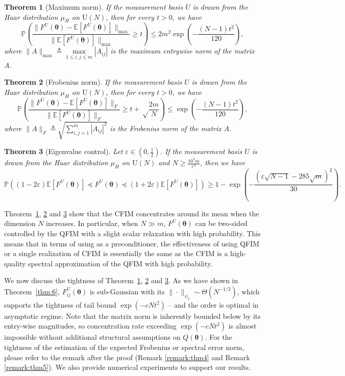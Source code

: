 \documentclass{amsart}
\theoremstyle{plain}
\newtheorem{theorem}{Theorem}
\theoremstyle{definition}
\theoremstyle{remark}
\newcommand{\thmref}[1]{Theorem~\ref{#1}}
\newcommand{\PP}{\mathbb{P}}
\newcommand{\EE}{\mathbb{E}}
\begin{document}
\begin{theorem}[Maximum norm]
\label{3}
    If the measurement basis $U$ is drawn from the Haar distribution $\mu_H$ on $\mathrm U(N)$, then for every $t>0$, we have
    \begin{equation}
        \PP\left(\frac{\|F^U(\bm\theta)-\EE[F^U(\bm\theta)]\|_{\max}}{\|\EE[F^U(\bm\theta)]\|_{\max}}\geq t\right)\leq 2m^2\exp\left(-\frac{(N-1)t^2}{120}\right),
    \end{equation}
    where $\|A\|_{\max} \triangleq\max\limits_{1\leq i,j\leq m}|A_{ij}|$ is the maximum entrywise norm of the matrix $A$.
\end{theorem}
\begin{theorem}[Frobenius norm]
\label{4}
       If the measurement basis $U$ is drawn from the Haar distribution $\mu_H$ on $\mathrm U(N)$, then for every $t>0$, we have 
          \begin{equation}
        \PP\left(\frac{\|F^U(\bm\theta)-\EE[F^U(\bm\theta)]\|_F}{\|\EE[F^U(\bm\theta)]\|_{F}}\geq t+\sqrt\frac{2m}{N}\right)\leq \exp\left(-\frac{(N-1)t^2}{120}\right),
    \end{equation}
where $\|A\|_{F} \triangleq \sqrt{\sum\limits_{i,j=1}^m|A_{ij}|^2}$ is the Frobenius norm of the matrix $A$.    
\end{theorem}

\begin{theorem}[Eigenvalue control]
\label{5}
    Let $\varepsilon\in(0,\frac{1}{2})$. If the measurement basis $U$ is drawn from the Haar distribution $\mu_H$ on $\mathrm U(N)$ and  $N\geq\frac{10^5m}{\varepsilon^2}$, then we have
    \begin{equation}
        \PP\left((1-2\varepsilon)\EE[F^U(\bm\theta)]\preceq F^U(\bm\theta)\preceq (1+2\varepsilon)\EE[F^U(\bm\theta)]\right) \geq 1-\exp\left(-\frac{(\varepsilon\sqrt{N-1}-285\sqrt{m})^2}{30}\right).
    \end{equation}
\end{theorem}
\thmref{3}, \ref{4} and \ref{5} show that the CFIM concentrates around its mean when the dimension $N$ increases. In particular, when $N\gg m$, $F^U(\bm\theta)$ can be two-sided controlled by the QFIM with a slight scalar relaxation with high probability. This means that in terms of using as a preconditioner, the effectiveness of using QFIM or a single realization of CFIM is essentially the same as the CFIM is a high-quality spectral approximation of the QFIM with high probability. 


We now discuss the tightness of \thmref{3}, \ref{4} and \ref{5}.  As we have shown in \thmref{thm:6},  $F^U_{ij}(\bm\theta)$ is sub-Gaussian with its $\|\cdot\|_{\psi_2}\sim \Theta(N^{-1/2})$, which supports the tightness of tail bound $\exp(-cNt^2)$ -- and the order is optimal in asymptotic regime. Note that the matrix norm is inherently bounded below by its entry-wise magnitudes, so concentration rate exceeding $\exp(-cNt^2)$ is almost impossible without additional structural assumptions on $Q(\bm\theta)$. For the tightness of the estimation of the expected Frobenius or spectral error norm, please refer to the remark after the proof (Remark \ref{remark:thm4} and Remark \ref{remark:thm5}).
We also provide numerical experiments to support our results.
\end{document}
